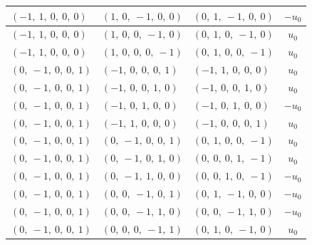 \documentclass[11pt]{article}
\theoremstyle{definition}
\begin{document}
\begin{longtable}{|l|l|l|c|}
    \hline
    $\left( -1, \  1, \  0, \  0, \  0\right)$ & $\left( 1, \  0, \  -1, \  0, \  0\right)$ & $\left( 0, \  1, \  -1, \  0, \  0\right)$ & $- u_{0}$ \\
    \hline
    $\left( -1, \  1, \  0, \  0, \  0\right)$ & $\left( 1, \  0, \  0, \  -1, \  0\right)$ & $\left( 0, \  1, \  0, \  -1, \  0\right)$ & $u_{0}$ \\
    \hline
    $\left( -1, \  1, \  0, \  0, \  0\right)$ & $\left( 1, \  0, \  0, \  0, \  -1\right)$ & $\left( 0, \  1, \  0, \  0, \  -1\right)$ & $u_{0}$ \\
    \hline
    $\left( 0, \  -1, \  0, \  0, \  1\right)$ & $\left( -1, \  0, \  0, \  0, \  1\right)$ & $\left( -1, \  1, \  0, \  0, \  0\right)$ & $u_{0}$ \\
    \hline
    $\left( 0, \  -1, \  0, \  0, \  1\right)$ & $\left( -1, \  0, \  0, \  1, \  0\right)$ & $\left( -1, \  0, \  0, \  1, \  0\right)$ & $u_{0}$ \\
    \hline
    $\left( 0, \  -1, \  0, \  0, \  1\right)$ & $\left( -1, \  0, \  1, \  0, \  0\right)$ & $\left( -1, \  0, \  1, \  0, \  0\right)$ & $- u_{0}$ \\
    \hline
    $\left( 0, \  -1, \  0, \  0, \  1\right)$ & $\left( -1, \  1, \  0, \  0, \  0\right)$ & $\left( -1, \  0, \  0, \  0, \  1\right)$ & $u_{0}$ \\
    \hline
    $\left( 0, \  -1, \  0, \  0, \  1\right)$ & $\left( 0, \  -1, \  0, \  0, \  1\right)$ & $\left( 0, \  1, \  0, \  0, \  -1\right)$ & $u_{0}$ \\
    \hline
    $\left( 0, \  -1, \  0, \  0, \  1\right)$ & $\left( 0, \  -1, \  0, \  1, \  0\right)$ & $\left( 0, \  0, \  0, \  1, \  -1\right)$ & $u_{0}$ \\
    \hline
    $\left( 0, \  -1, \  0, \  0, \  1\right)$ & $\left( 0, \  -1, \  1, \  0, \  0\right)$ & $\left( 0, \  0, \  1, \  0, \  -1\right)$ & $- u_{0}$ \\
    \hline
    $\left( 0, \  -1, \  0, \  0, \  1\right)$ & $\left( 0, \  0, \  -1, \  0, \  1\right)$ & $\left( 0, \  1, \  -1, \  0, \  0\right)$ & $- u_{0}$ \\
    \hline
    $\left( 0, \  -1, \  0, \  0, \  1\right)$ & $\left( 0, \  0, \  -1, \  1, \  0\right)$ & $\left( 0, \  0, \  -1, \  1, \  0\right)$ & $- u_{0}$ \\
    \hline
    $\left( 0, \  -1, \  0, \  0, \  1\right)$ & $\left( 0, \  0, \  0, \  -1, \  1\right)$ & $\left( 0, \  1, \  0, \  -1, \  0\right)$ & $u_{0}$ \\

\end{longtable}
\end{document}
